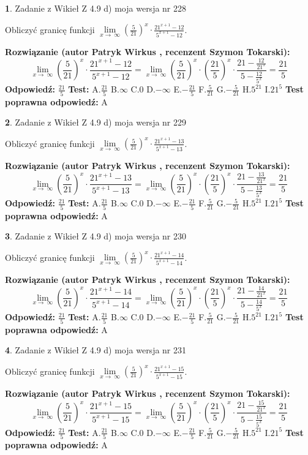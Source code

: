 \documentclass[12pt, a4paper]{article}
\theoremstyle{definition} %
\newtheorem{zad}{}
\newcommand{\zadStart}[1]{\begin{zad}#1\newline}
\newcommand{\zadStop}{\end{zad}}
\newcommand{\rozwStart}[2]{\noindent \textbf{Rozwiązanie (autor #1 , recenzent #2): }\newline}
\newcommand{\rozwStop}{\newline}
\newcommand{\odpStart}{\noindent \textbf{Odpowiedź:}\newline}
\newcommand{\odpStop}{\newline}
\newcommand{\testStart}{\noindent \textbf{Test:}\newline}
\newcommand{\testStop}{\newline}
\newcommand{\kluczStart}{\noindent \textbf{Test poprawna odpowiedź:}\newline}
\newcommand{\kluczStop}{\newline}
\begin{document}
\zadStart{Zadanie z Wikieł Z 4.9 d) moja wersja nr 228}


Obliczyć granicę funkcji  $\lim\limits_{x\to\ \infty}(\frac{5}{21})^{x}\cdot\frac{21^{x+1}-12}{5^{x+1}-12}$.
\zadStop
\rozwStart{Patryk Wirkus}{Szymon Tokarski}
$$\lim\limits_{x\to\ \infty}(\frac{5}{21})^{x}\cdot\frac{21^{x+1}-12}{5^{x+1}-12}=\lim\limits_{x\to\ \infty}(\frac{5}{21})^{x}\cdot(\frac{21}{5})^{x} \cdot \frac{21-\frac{12}{21^{x}}}{5-\frac{12}{5^{x}}} = \frac{21}{5}$$
\rozwStop
\odpStart
$\frac{21}{5}$
\odpStop
\testStart
A.$\frac{21}{5}$ B.$\infty$ C.$0$ D.$-\infty$ E.$-\frac{21}{5}$
F.$\frac{5}{21}$ G.$-\frac{5}{21}$
H.$5^{21}$
I.$21^{5}$
\testStop
\kluczStart
A
\kluczStop



\zadStart{Zadanie z Wikieł Z 4.9 d) moja wersja nr 229}


Obliczyć granicę funkcji  $\lim\limits_{x\to\ \infty}(\frac{5}{21})^{x}\cdot\frac{21^{x+1}-13}{5^{x+1}-13}$.
\zadStop
\rozwStart{Patryk Wirkus}{Szymon Tokarski}
$$\lim\limits_{x\to\ \infty}(\frac{5}{21})^{x}\cdot\frac{21^{x+1}-13}{5^{x+1}-13}=\lim\limits_{x\to\ \infty}(\frac{5}{21})^{x}\cdot(\frac{21}{5})^{x} \cdot \frac{21-\frac{13}{21^{x}}}{5-\frac{13}{5^{x}}} = \frac{21}{5}$$
\rozwStop
\odpStart
$\frac{21}{5}$
\odpStop
\testStart
A.$\frac{21}{5}$ B.$\infty$ C.$0$ D.$-\infty$ E.$-\frac{21}{5}$
F.$\frac{5}{21}$ G.$-\frac{5}{21}$
H.$5^{21}$
I.$21^{5}$
\testStop
\kluczStart
A
\kluczStop



\zadStart{Zadanie z Wikieł Z 4.9 d) moja wersja nr 230}


Obliczyć granicę funkcji  $\lim\limits_{x\to\ \infty}(\frac{5}{21})^{x}\cdot\frac{21^{x+1}-14}{5^{x+1}-14}$.
\zadStop
\rozwStart{Patryk Wirkus}{Szymon Tokarski}
$$\lim\limits_{x\to\ \infty}(\frac{5}{21})^{x}\cdot\frac{21^{x+1}-14}{5^{x+1}-14}=\lim\limits_{x\to\ \infty}(\frac{5}{21})^{x}\cdot(\frac{21}{5})^{x} \cdot \frac{21-\frac{14}{21^{x}}}{5-\frac{14}{5^{x}}} = \frac{21}{5}$$
\rozwStop
\odpStart
$\frac{21}{5}$
\odpStop
\testStart
A.$\frac{21}{5}$ B.$\infty$ C.$0$ D.$-\infty$ E.$-\frac{21}{5}$
F.$\frac{5}{21}$ G.$-\frac{5}{21}$
H.$5^{21}$
I.$21^{5}$
\testStop
\kluczStart
A
\kluczStop



\zadStart{Zadanie z Wikieł Z 4.9 d) moja wersja nr 231}


Obliczyć granicę funkcji  $\lim\limits_{x\to\ \infty}(\frac{5}{21})^{x}\cdot\frac{21^{x+1}-15}{5^{x+1}-15}$.
\zadStop
\rozwStart{Patryk Wirkus}{Szymon Tokarski}
$$\lim\limits_{x\to\ \infty}(\frac{5}{21})^{x}\cdot\frac{21^{x+1}-15}{5^{x+1}-15}=\lim\limits_{x\to\ \infty}(\frac{5}{21})^{x}\cdot(\frac{21}{5})^{x} \cdot \frac{21-\frac{15}{21^{x}}}{5-\frac{15}{5^{x}}} = \frac{21}{5}$$
\rozwStop
\odpStart
$\frac{21}{5}$
\odpStop
\testStart
A.$\frac{21}{5}$ B.$\infty$ C.$0$ D.$-\infty$ E.$-\frac{21}{5}$
F.$\frac{5}{21}$ G.$-\frac{5}{21}$
H.$5^{21}$
I.$21^{5}$
\testStop
\kluczStart
A
\kluczStop
\end{document}
